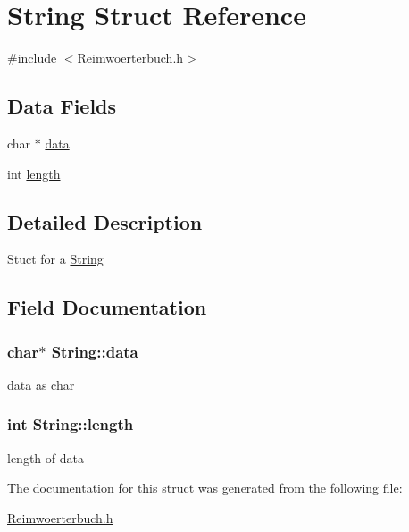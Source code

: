 \hypertarget{structString}{\section{String Struct Reference}
\label{structString}
}


{\ttfamily \#include $<$Reimwoerterbuch.\-h$>$}

\subsection*{Data Fields}
\begin{DoxyCompactItemize}
\item 
char $\ast$ \hyperlink{structString_aac3cd44be218d486e9fe9ecb08662752}{data}
\item 
int \hyperlink{structString_a3fed7b60ef544b02216a8d9100756624}{length}
\end{DoxyCompactItemize}


\subsection{Detailed Description}
Stuct for a \hyperlink{structString}{String} 

\subsection{Field Documentation}
\hypertarget{structString_aac3cd44be218d486e9fe9ecb08662752}{
\subsubsection[{data}]{\setlength{\rightskip}{0pt plus 5cm}char$\ast$ String\-::data}}\label{structString_aac3cd44be218d486e9fe9ecb08662752}
data as char \hypertarget{structString_a3fed7b60ef544b02216a8d9100756624}{
\subsubsection[{length}]{\setlength{\rightskip}{0pt plus 5cm}int String\-::length}}\label{structString_a3fed7b60ef544b02216a8d9100756624}
length of data 

The documentation for this struct was generated from the following file\-:\begin{DoxyCompactItemize}
\item 
\hyperlink{Reimwoerterbuch_8h}{Reimwoerterbuch.\-h}\end{DoxyCompactItemize}

